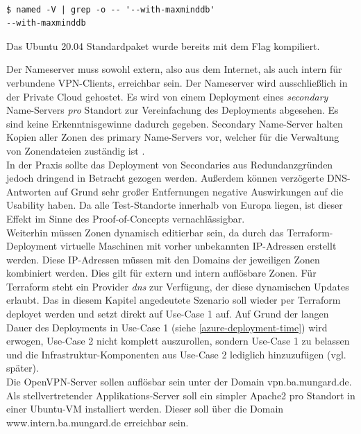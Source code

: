\begin{listing}[h]
\begin{verbatim}

$ named -V | grep -o -- '--with-maxminddb'
--with-maxminddb

\end{verbatim}
\caption{Das Ubuntu 20.04 Standardpaket wurde bereits mit dem Flag kompiliert.}
\label{bind-mmdb-compiler-flag}
\end{listing}
Der Nameserver muss sowohl extern, also aus dem Internet, als auch intern für verbundene VPN-Clients, erreichbar sein. Der Nameserver wird ausschließlich in der Private Cloud gehostet. Es wird von einem Deployment eines \textit{secondary} Name-Servers \textit{pro} Standort zur Vereinfachung des Deployments abgesehen. Es sind keine Erkenntnisgewinne dadurch gegeben. Secondary Name-Server halten Kopien aller Zonen des primary Name-Servers vor, welcher für die Verwaltung von Zonendateien zuständig ist \cite[S.517]{Fall2011}.\\
In der Praxis sollte das Deployment von \glqq Secondaries\grqq{} aus Redundanzgründen jedoch dringend in Betracht gezogen werden. Außerdem können \glqq verzögerte\grqq{} DNS-Antworten auf Grund sehr großer Entfernungen negative Auswirkungen auf die Usability haben. Da alle Test-Standorte innerhalb von Europa liegen, ist dieser Effekt im Sinne des Proof-of-Concepts vernachlässigbar.\\
Weiterhin müssen Zonen dynamisch editierbar sein, da durch das Terraform-Deployment virtuelle Maschinen mit vorher unbekannten IP-Adressen erstellt werden. Diese IP-Adressen müssen mit den Domains der jeweiligen Zonen kombiniert werden. Dies gilt für extern und intern auflösbare Zonen. Für Terraform steht ein Provider \textit{dns} zur Verfügung, der diese dynamischen Updates erlaubt\cite{dnstf2021}.
Das in diesem Kapitel angedeutete Szenario soll wieder per Terraform deployet werden und setzt direkt auf Use-Case 1 auf. Auf Grund der langen Dauer des Deployments in Use-Case 1 (siehe \ref{azure-deployment-time}) wird erwogen, Use-Case 2 nicht \glqq komplett\grqq{} auszurollen, sondern Use-Case 1 zu belassen und die Infrastruktur-Komponenten aus Use-Case 2 lediglich hinzuzufügen (vgl. später).\\
Die OpenVPN-Server sollen auflösbar sein unter der Domain vpn.ba.mungard.de.\\
Als stellvertretender \glqq Applikations-Server\grqq{} soll ein simpler Apache2 pro Standort in einer Ubuntu-VM installiert werden. Dieser soll über die Domain www.intern.ba.mungard.de erreichbar sein.
%
